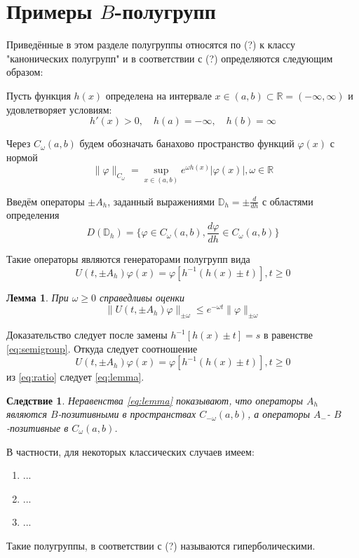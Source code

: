 \documentclass{article}
\newtheorem{lemma}{Лемма}
\newtheorem{corollary}{Следствие}[lemma]
\begin{document}
\section*{Примеры $B$-полугрупп}

Приведённые в этом разделе полугруппы относятся по (?) к классу "канонических полугрупп" и в соответствии
с (?) определяются следующим образом:

Пусть функция $h(x)$ определена на интервале $x \in (a, b) \subset \mathbb{R} = (-\infty, \infty)$
и удовлетворяет условиям:
\begin{equation*}
    h'(x) > 0, \quad h(a) = -\infty, \quad h(b) = \infty
\end{equation*}

Через $C_\omega (a, b)$ будем обозначать банахово пространство функций $\varphi (x)$ с нормой
\begin{equation}
    \|\varphi\|_{C_\omega} = \sup_{x \in (a, b)} e^{\omega h(x)} |\varphi(x)|, \omega \in \mathbb{R}
\end{equation}

Введём операторы $\pm A_h$, заданный выражениями $\mathbb{D}_h = \pm \frac{d}{dh}$ с областями определения
\begin{equation}
    D(\mathbb{D}_h) = \{\varphi \in C_\omega(a, b), \frac{d\varphi}{dh} \in C_\omega(a, b)\}
\end{equation}

Такие операторы являются генераторами полугрупп вида
\begin{equation}
    \label{eq:semigroup}
    U(t, \pm A_h)\varphi(x) = \varphi[h^{-1}(h(x) \pm t)], t \ge 0
\end{equation}

\begin{lemma}
    При $\omega \ge 0$ справедливы оценки
    \begin{equation}
        \label{eq:lemma}
        \|U(t, \pm A_h)\varphi\|_{\pm\omega} \le e^{-\omega t} \|\varphi\|_{\pm \omega}
    \end{equation}
\end{lemma}

Доказательство следует после замены $h^{-1}[h(x) \pm t] = s$ в равенстве \eqref{eq:semigroup}. Откуда
следует соотношение
\begin{equation}
    \label{eq:ratio}
    U(t, \pm A_h)\varphi(x) = \varphi[h^{-1}(h(x) \pm t)], t \ge 0
\end{equation}
из \eqref{eq:ratio} следует \eqref{eq:lemma}.

\begin{corollary}
        Неравенства \eqref{eq:lemma} показывают, что операторы $A_h$ являются $B$-позитивными
        в пространствах $C_{-\omega}(a, b)$, а операторы $A_{-}$- $B$-позитивные в $C_{\omega}(a, b)$.
\end{corollary}

В частности, для некоторых классических случаев имеем:
\begin{enumerate}
    \item ...
    \item ...
    \item ...
\end{enumerate}

Такие полугруппы, в соответствии с (?) называются гиперболическими.
\end{document}
